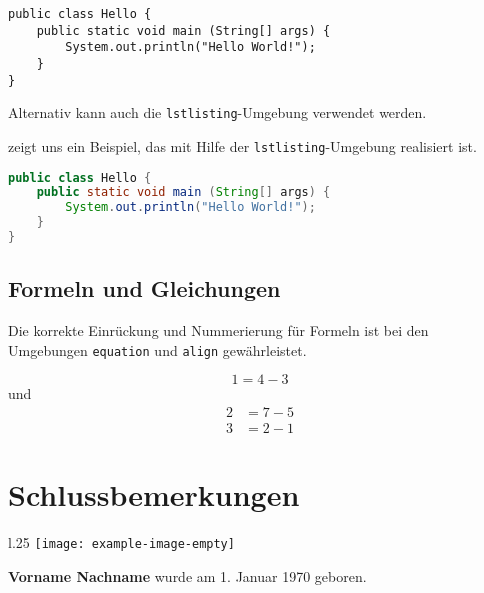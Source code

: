 \documentclass[draft,utf8,biblatex,norunningheads]{lni}
\begin{document}
\begin{verbatim}
public class Hello {
    public static void main (String[] args) {
        System.out.println("Hello World!");
    }
}
\end{verbatim}

Alternativ kann auch die \texttt{lstlisting}-Umgebung verwendet werden.

 zeigt uns ein Beispiel, das mit Hilfe der \texttt{lstlisting}-Umgebung realisiert ist.

\begin{lstlisting}[caption={Beschreibung}, label=L1, language=Java]
public class Hello {
    public static void main (String[] args) {
        System.out.println("Hello World!");
    }
}
\end{lstlisting}

\subsection{Formeln und Gleichungen}

Die korrekte Einrückung und Nummerierung für Formeln ist bei den Umgebungen
\texttt{equation} und \texttt{align} gewährleistet.

\begin{equation}
  1=4-3
\end{equation}
und
\begin{align}
  2&=7-5\\
  3&=2-1
\end{align}

\section{Schlussbemerkungen}

\blindtext

\printbibliography

\begin{wrapfigure}{l}{.25\textwidth}
\texttt{[image: example-image-empty]}
\end{wrapfigure}
\noindent\textbf{Vorname Nachname} wurde am 1. Januar 1970
geboren. \blindtext
\end{document}
